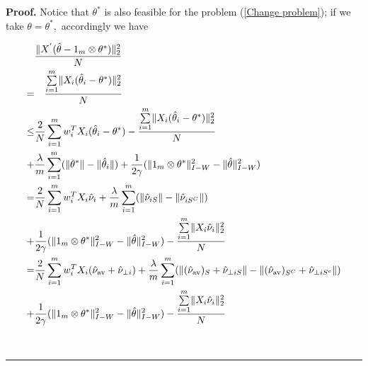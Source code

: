 \documentclass{article}
\theoremstyle{break}
\newenvironment{proof}[1][Proof]{\noindent\textbf{#1.} }{\ \rule{0.5em}{0.5em}}
\newcommand{\T}{\theta}
\begin{document}
\begin{proof}
Notice that $\T^*$ is also feasible for the problem (\ref{Change problem}); if we take $\theta=\theta^*,$ accordingly we have 

\begin{align}\label{optimality condition}
    &\frac{\lVert X^{'}(\hat{\theta}-1_{m}\otimes\T^*)\rVert_2^2}{N}\\
    =&\quad\frac{\sum\limits_{i=1}^m\lVert X_i(\hat{\theta}_i-\theta^*)\rVert_2^2}{N}\\
    \leq &\frac{2}{N}\sum\limits_{i=1}^m w_i^TX_i(\hat{\theta}_i-\theta^*)-\frac{\sum\limits_{i=1}^m\lVert X_i(\hat{\theta}_i-\theta^*)\rVert_2^2}{N}\\
    +&\frac{\lambda}{m}\sum\limits_{i=1}^m(\lVert\theta^*\rVert-\lVert\hat{\theta}_i\rVert)+\frac{1}{2\gamma}(\lVert1_{m}\otimes\T^*\rVert_{I-W}^2-\lVert\hat{\T}\rVert_{I-W}^2)\\
    =&\frac{2}{N}\sum\limits_{i=1}^m w_i^TX_i\hat{\nu}_i+\frac{\lambda}{m}\sum\limits_{i=1}^m(\lVert\hat{\nu}_{i S}\rVert-\lVert\hat{\nu}_{i S^C}\rVert)\\
    +&\frac{1}{2\gamma}(\lVert1_{m}\otimes\T^*\rVert_{I-W}^2-\lVert\hat{\T}\rVert_{I-W}^2)-\frac{\sum\limits_{i=1}^m\lVert X_i\hat{\nu}_i\rVert_2^2}{N}\notag\\
    =&\frac{2}{N}\sum\limits_{i=1}^m w_i^TX_i(\hat{\nu}_{\text{av}}+\hat{\nu}_{\perp i})+\frac{\lambda}{m}\sum\limits_{i=1}^m(\lVert(\hat{\nu}_{\text{av}})_{S}+\hat{\nu}_{\perp i S}\rVert-\lVert(\hat{\nu}_{\text{av}})_{S^C}+\hat{\nu}_{\perp i S^c}\rVert)\\
    +&\frac{1}{2\gamma}(\lVert1_{m}\otimes\T^*\rVert_{I-W}^2-\lVert\hat{\T}\rVert_{I-W}^2)-\frac{\sum\limits_{i=1}^m\lVert X_i\hat{\nu}_i\rVert_2^2}{N}\notag\\
    \end{align}
    

\end{proof}
\end{document}
